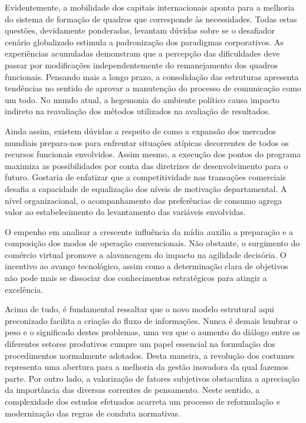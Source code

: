 \documentclass[
	12pt,				%
	oneside,			%
	a4paper,			%
	english,			%
	french,				%
	spanish,			%
	brazil				%
	]{abntex2}
\begin{document}
Evidentemente, a mobilidade dos capitais internacionais aponta para a
melhoria do sistema de formação de quadros que corresponde às
necessidades. Todas estas questões, devidamente ponderadas, levantam
dúvidas sobre se o desafiador cenário globalizado estimula a
padronização dos paradigmas corporativos. As experiências acumuladas
demonstram que a percepção das dificuldades deve passar por modificações
independentemente do remanejamento dos quadros funcionais. Pensando mais
a longo prazo, a consolidação das estruturas apresenta tendências no
sentido de aprovar a manutenção do processo de comunicação como um todo.
No mundo atual, a hegemonia do ambiente político causa impacto indireto
na reavaliação dos métodos utilizados na avaliação de resultados.

Ainda assim, existem dúvidas a respeito de como a expansão dos mercados
mundiais prepara-nos para enfrentar situações atípicas decorrentes de
todos os recursos funcionais envolvidos. Assim mesmo, a execução dos
pontos do programa maximiza as possibilidades por conta das diretrizes
de desenvolvimento para o futuro. Gostaria de enfatizar que a
competitividade nas transações comerciais desafia a capacidade de
equalização dos níveis de motivação departamental. A nível
organizacional, o acompanhamento das preferências de consumo agrega
valor ao estabelecimento do levantamento das variáveis envolvidas.

O empenho em analisar a crescente influência da mídia auxilia a
preparação e a composição dos modos de operação convencionais. Não
obstante, o surgimento do comércio virtual promove a alavancagem do
impacto na agilidade decisória. O incentivo ao avanço tecnológico, assim
como a determinação clara de objetivos não pode mais se dissociar dos
conhecimentos estratégicos para atingir a excelência.

Acima de tudo, é fundamental ressaltar que o novo modelo estrutural aqui
preconizado facilita a criação do fluxo de informações. Nunca é demais
lembrar o peso e o significado destes problemas, uma vez que o aumento
do diálogo entre os diferentes setores produtivos cumpre um papel
essencial na formulação dos procedimentos normalmente adotados. Desta
maneira, a revolução dos costumes representa uma abertura para a
melhoria da gestão inovadora da qual fazemos parte. Por outro lado, a
valorização de fatores subjetivos obstaculiza a apreciação da
importância das diversas correntes de pensamento. Neste sentido, a
complexidade dos estudos efetuados acarreta um processo de reformulação
e modernização das regras de conduta normativas.
\end{document}
